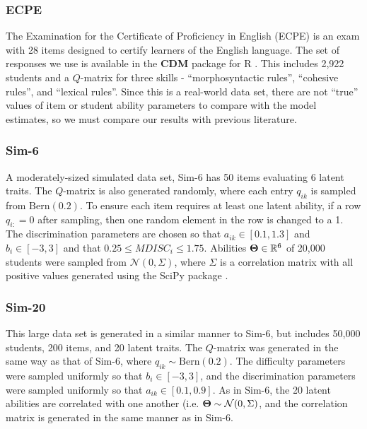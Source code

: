 \subsubsection*{ECPE} The Examination for the Certificate of Proficiency in English (ECPE) is an exam with 28 items designed to certify learners of the English language. The set of responses we use is available in the \textbf{CDM} package for R \cite{cdm}. This includes 2,922 students and a $Q$-matrix for three skills - ``morphosyntactic rules'', ``cohesive rules'', and ``lexical rules''. Since this is a real-world data set, there are not ``true'' values of item or student ability parameters to compare with the model estimates, so we must compare our results with previous literature.

\subsubsection*{Sim-6} A moderately-sized simulated data set, Sim-6 has 50 items evaluating 6 latent traits. The $Q$-matrix is also generated randomly, where each entry $q_{ik}$ is sampled from $\text{Bern}(0.2)$. To ensure each item requires at least one latent ability, if a row $q_{i:} = 0$ after sampling, then one random element in the row is changed to a 1. The discrimination parameters are chosen so that $a_{ik} \in [0.1, 1.3]$ and $b_i \in[-3,3]$ and that $0.25 \leq MDISC_i \leq 1.75$. Abilities $\boldsymbol{\Theta} \in \mathbb{R}^6$ of 20,000 students were sampled from $\mathcal{N}(0, \Sigma)$, where $\Sigma$ is a correlation matrix with all positive values generated using the SciPy package \cite{SciPy}.

\subsubsection*{Sim-20} This large data set is generated in a similar manner to Sim-6, but includes 50,000 students, 200 items, and 20 latent traits. The $Q$-matrix was generated in the same way as that of Sim-6, where $q_{ik} \sim \text{Bern}(0.2)$. The difficulty parameters were sampled uniformly so that $b_i \in [-3,3]$, and the discrimination parameters were sampled uniformly so that $a_{ik} \in [0.1, 0.9]$. As in Sim-6, the 20 latent abilities are correlated with one another (i.e. $\boldsymbol{\Theta} \sim \mathcal{N}(0, \Sigma)$, and the correlation matrix is generated in the same manner as in Sim-6.

